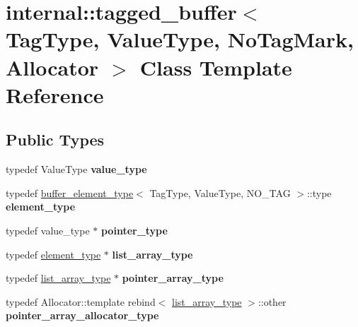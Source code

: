 \hypertarget{classinternal_1_1tagged__buffer}{}\section{internal\+:\+:tagged\+\_\+buffer$<$ Tag\+Type, Value\+Type, No\+Tag\+Mark, Allocator $>$ Class Template Reference}
\label{classinternal_1_1tagged__buffer}
\subsection*{Public Types}
\begin{DoxyCompactItemize}
\item 
\hypertarget{classinternal_1_1tagged__buffer_af88accaa526b90d72194caeea3879126}{}typedef Value\+Type {\bfseries value\+\_\+type}\label{classinternal_1_1tagged__buffer_af88accaa526b90d72194caeea3879126}

\item 
\hypertarget{classinternal_1_1tagged__buffer_a9c7c6a10950e4249198eb28951f7b165}{}typedef \hyperlink{structinternal_1_1buffer__element__type}{buffer\+\_\+element\+\_\+type}$<$ Tag\+Type, Value\+Type, N\+O\+\_\+\+T\+A\+G $>$\+::type {\bfseries element\+\_\+type}\label{classinternal_1_1tagged__buffer_a9c7c6a10950e4249198eb28951f7b165}

\item 
\hypertarget{classinternal_1_1tagged__buffer_ab1c18e48d1ed80d9d339001c09ee266e}{}typedef value\+\_\+type $\ast$ {\bfseries pointer\+\_\+type}\label{classinternal_1_1tagged__buffer_ab1c18e48d1ed80d9d339001c09ee266e}

\item 
\hypertarget{classinternal_1_1tagged__buffer_a9b83b13d9b5d23f6b0b0d3986aeb7e86}{}typedef \hyperlink{structinternal_1_1type__plus__align}{element\+\_\+type} $\ast$ {\bfseries list\+\_\+array\+\_\+type}\label{classinternal_1_1tagged__buffer_a9b83b13d9b5d23f6b0b0d3986aeb7e86}

\item 
\hypertarget{classinternal_1_1tagged__buffer_a20b45b787405535bc3a95ccc9c2785e9}{}typedef \hyperlink{structinternal_1_1type__plus__align}{list\+\_\+array\+\_\+type} $\ast$ {\bfseries pointer\+\_\+array\+\_\+type}\label{classinternal_1_1tagged__buffer_a20b45b787405535bc3a95ccc9c2785e9}

\item 
\hypertarget{classinternal_1_1tagged__buffer_a8dc54a32c3f7ac1594f8bdc533250bc3}{}typedef Allocator\+::template rebind$<$ \hyperlink{structinternal_1_1type__plus__align}{list\+\_\+array\+\_\+type} $>$\+::other {\bfseries pointer\+\_\+array\+\_\+allocator\+\_\+type}\label{classinternal_1_1tagged__buffer_a8dc54a32c3f7ac1594f8bdc533250bc3}


\end{DoxyCompactItemize}
